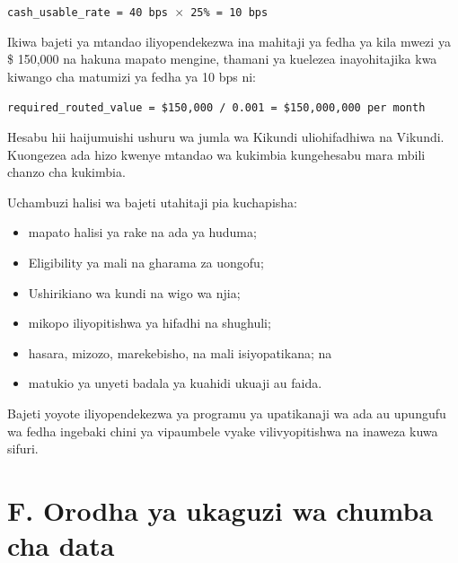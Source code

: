 \documentclass[11pt]{article}
\begin{document}
\texttt{cash\_usable\_rate = 40 bps $\times$ 25\% = 10 bps}

Ikiwa bajeti ya mtandao iliyopendekezwa ina mahitaji ya fedha ya kila mwezi ya \$ 150,000 na hakuna mapato mengine, thamani ya kuelezea inayohitajika kwa kiwango cha matumizi ya fedha ya 10 bps ni:

\texttt{required\_routed\_value = \$150,000 / 0.001 = \$150,000,000 per month}

Hesabu hii haijumuishi ushuru wa jumla wa Kikundi uliohifadhiwa na Vikundi. Kuongezea ada hizo kwenye mtandao wa kukimbia kungehesabu mara mbili chanzo cha kukimbia.

Uchambuzi halisi wa bajeti utahitaji pia kuchapisha:

\begin{itemize}[leftmargin=*]
\item mapato halisi ya rake na ada ya huduma;
\item Eligibility ya mali na gharama za uongofu;
\item Ushirikiano wa kundi na wigo wa njia;
\item mikopo iliyopitishwa ya hifadhi na shughuli;
\item hasara, mizozo, marekebisho, na mali isiyopatikana; na
\item matukio ya unyeti badala ya kuahidi ukuaji au faida.
\end{itemize}
Bajeti yoyote iliyopendekezwa ya programu ya upatikanaji wa ada au upungufu wa fedha ingebaki chini ya vipaumbele vyake vilivyopitishwa na inaweza kuwa sifuri.


\section*{F. Orodha ya ukaguzi wa chumba cha data}
\end{document}
